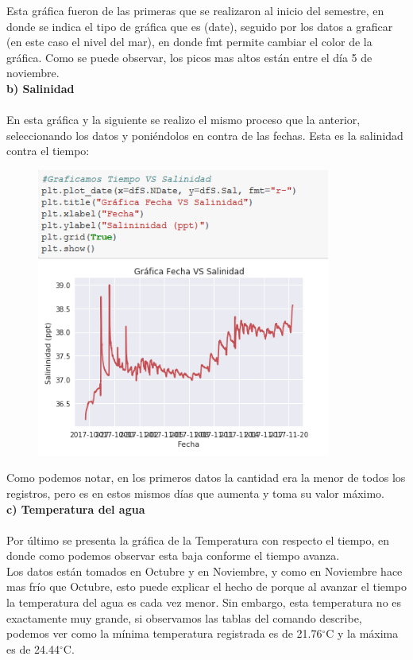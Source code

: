 \documentclass[12pt]{article}
\begin{document}
Esta gráfica fueron de las primeras que se realizaron al inicio del semestre, en donde se indica el tipo de gráfica que es (date), seguido por los datos a graficar (en este caso el nivel del mar), en donde fmt permite cambiar el color de la gráfica. Como se puede observar, los picos mas altos están entre el día 5 de noviembre.  \\

\noindent\textbf {b) Salinidad} \\ \\
En esta gráfica y la siguiente se realizo el mismo proceso que la anterior, seleccionando los datos y poniéndolos en contra de las fechas. Esta es la salinidad contra el tiempo:

\begin{figure}[h!]
    \centering
\includegraphics[width=3.8in]{GrafF2.png}
\end{figure}

Como podemos notar, en los primeros datos la cantidad era la menor de todos los registros, pero es en estos mismos días que aumenta y toma su valor máximo. \\

\noindent\textbf {c) Temperatura del agua} \\ \\
Por último se presenta la gráfica de la Temperatura con respecto el tiempo, en donde como podemos observar esta baja conforme el tiempo avanza. \\

Los datos están tomados en Octubre y en Noviembre, y como en Noviembre hace mas frío que Octubre, esto puede explicar el hecho de porque al avanzar el tiempo la temperatura del agua es cada vez menor. Sin embargo, esta temperatura no es exactamente muy grande, si observamos las tablas del comando describe, podemos ver como la mínima temperatura registrada es de 21.76$^{\circ}$C y la máxima es de 24.44$^{\circ}$C. \\
\end{document}
